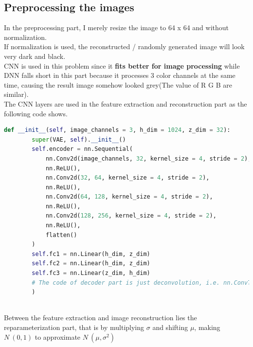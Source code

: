 \documentclass[11pt, a4paper]{article} %
\begin{document}
\subsection{Preprocessing the images} %
In the preprocessing part, I merely resize the image to 64 x 64 and without normalization. 
\\ If normalization is used, the reconstructed / randomly generated image will look very dark and black.
\\ CNN is used in this problem since it \textbf{fits better for image processing} while DNN falls short in this part because it processes 3 color channels at the same time, causing the result image somehow looked grey(The value of R G B are similar).
\\ The CNN layers are used in the feature extraction and reconstruction part as the following code shows.
\begin{lstlisting}[language = python]
def __init__(self, image_channels = 3, h_dim = 1024, z_dim = 32):
        super(VAE, self).__init__()
        self.encoder = nn.Sequential(
            nn.Conv2d(image_channels, 32, kernel_size = 4, stride = 2),
            nn.ReLU(),
            nn.Conv2d(32, 64, kernel_size = 4, stride = 2),
            nn.ReLU(),
            nn.Conv2d(64, 128, kernel_size = 4, stride = 2),
            nn.ReLU(),
            nn.Conv2d(128, 256, kernel_size = 4, stride = 2),
            nn.ReLU(),
            flatten()
        )
        self.fc1 = nn.Linear(h_dim, z_dim)
        self.fc2 = nn.Linear(h_dim, z_dim)
        self.fc3 = nn.Linear(z_dim, h_dim)
        # The code of decoder part is just deconvolution, i.e. nn.ConvTranspose2d with reverse order and I/O dimension
        )
\end{lstlisting}
\\ Between the feature extraction and image reconstruction lies the reparameterization part, that is by multiplying $\sigma$ and shifting $\mu$, making $N~(0, 1)$ to approximate $N~(\mu, \sigma^2)$
\end{document}
